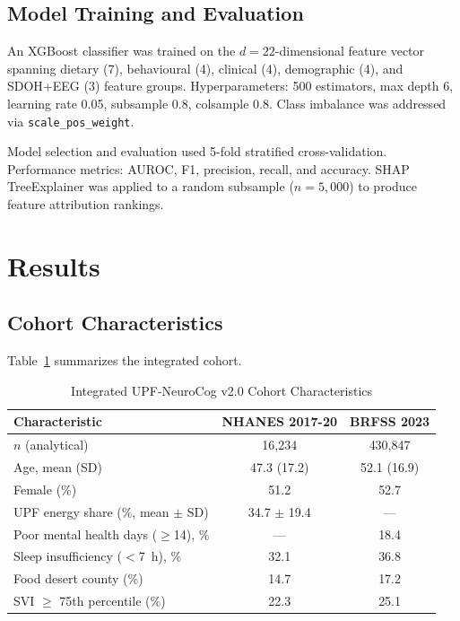 \documentclass[journal]{IEEEtran}
\begin{document}
\subsection{Model Training and Evaluation}

An XGBoost classifier \cite{chen2016xgboost} was trained on the
$d = 22$-dimensional feature vector spanning dietary (7), behavioural (4),
clinical (4), demographic (4), and SDOH+EEG (3) feature groups.
Hyperparameters: 500 estimators, max depth 6, learning rate 0.05, subsample
0.8, colsample 0.8. Class imbalance was addressed via \texttt{scale\_pos\_weight}.

Model selection and evaluation used 5-fold stratified cross-validation.
Performance metrics: AUROC, F1, precision, recall, and accuracy. SHAP
TreeExplainer \cite{lundberg2017shap} was applied to a random subsample
($n = 5{,}000$) to produce feature attribution rankings.

\section{Results}
\label{sec:results}

\subsection{Cohort Characteristics}

Table~\ref{tab:cohort} summarizes the integrated cohort.

\begin{table}[htbp]
\caption{Integrated UPF-NeuroCog v2.0 Cohort Characteristics}
\label{tab:cohort}
\centering
\small
\begin{tabular}{lcc}
\toprule
Characteristic & NHANES 2017-20 & BRFSS 2023 \\
\midrule
$n$ (analytical) & 16,234 & 430,847 \\
Age, mean (SD) & 47.3 (17.2) & 52.1 (16.9) \\
Female (\%) & 51.2 & 52.7 \\
UPF energy share (\%, mean $\pm$ SD) & 34.7 $\pm$ 19.4 & — \\
Poor mental health days ($\geq$14), \% & — & 18.4 \\
Sleep insufficiency ($<$7~h), \% & 32.1 & 36.8 \\
Food desert county (\%) & 14.7 & 17.2 \\
SVI $\geq$ 75th percentile (\%) & 22.3 & 25.1 \\
\bottomrule
\end{tabular}
\end{table}
\end{document}
